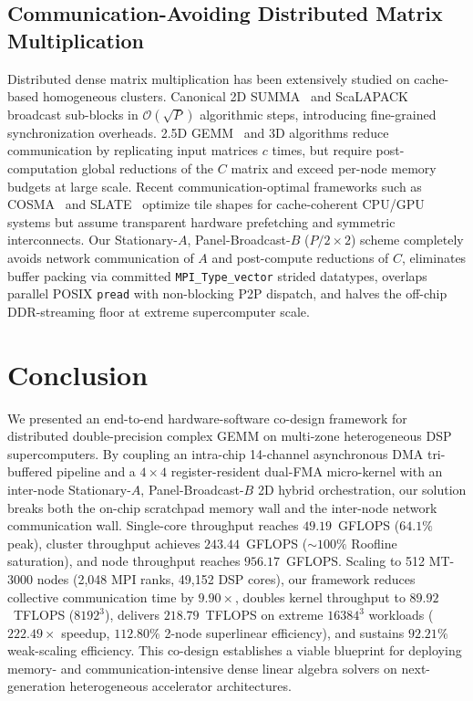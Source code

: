 \documentclass[conference]{IEEEtran}
\begin{document}
\subsection{Communication-Avoiding Distributed Matrix Multiplication}
Distributed dense matrix multiplication has been extensively studied on cache-based homogeneous clusters. Canonical 2D SUMMA~\cite{vandegeijn1997summa} and ScaLAPACK~\cite{choi1996scalapack} broadcast sub-blocks in $\mathcal{O}(\sqrt{P})$ algorithmic steps, introducing fine-grained synchronization overheads. 2.5D GEMM~\cite{solomonik2011comm25d} and 3D algorithms reduce communication by replicating input matrices $c$ times, but require post-computation global reductions of the $C$ matrix and exceed per-node memory budgets at large scale. Recent communication-optimal frameworks such as COSMA~\cite{kwasniewski2019cosma} and SLATE~\cite{gates2019slate} optimize tile shapes for cache-coherent CPU/GPU systems but assume transparent hardware prefetching and symmetric interconnects. Our Stationary-$A$, Panel-Broadcast-$B$ ($P/2 \times 2$) scheme completely avoids network communication of $A$ and post-compute reductions of $C$, eliminates buffer packing via committed \texttt{MPI\_Type\_vector} strided datatypes, overlaps parallel POSIX \texttt{pread} with non-blocking P2P dispatch, and halves the off-chip DDR-streaming floor at extreme supercomputer scale.

\section{Conclusion}
\label{sec:conclusion}
We presented an end-to-end hardware-software co-design framework for distributed double-precision complex GEMM on multi-zone heterogeneous DSP supercomputers. By coupling an intra-chip 14-channel asynchronous DMA tri-buffered pipeline and a $4 \times 4$ register-resident dual-FMA micro-kernel with an inter-node Stationary-$A$, Panel-Broadcast-$B$ 2D hybrid orchestration, our solution breaks both the on-chip scratchpad memory wall and the inter-node network communication wall. Single-core throughput reaches $49.19$~GFLOPS ($64.1\%$ peak), cluster throughput achieves $243.44$~GFLOPS ($\sim\!100\%$ Roofline saturation), and node throughput reaches $956.17$~GFLOPS. Scaling to 512 MT-3000 nodes (2,048 MPI ranks, 49,152 DSP cores), our framework reduces collective communication time by $9.90\times$, doubles kernel throughput to $89.92$~TFLOPS ($8192^3$), delivers $218.79$~TFLOPS on extreme $16384^3$ workloads ($222.49\times$ speedup, $112.80\%$ 2-node superlinear efficiency), and sustains $92.21\%$ weak-scaling efficiency. This co-design establishes a viable blueprint for deploying memory- and communication-intensive dense linear algebra solvers on next-generation heterogeneous accelerator architectures.

\clearpage
{}


\end{document}
